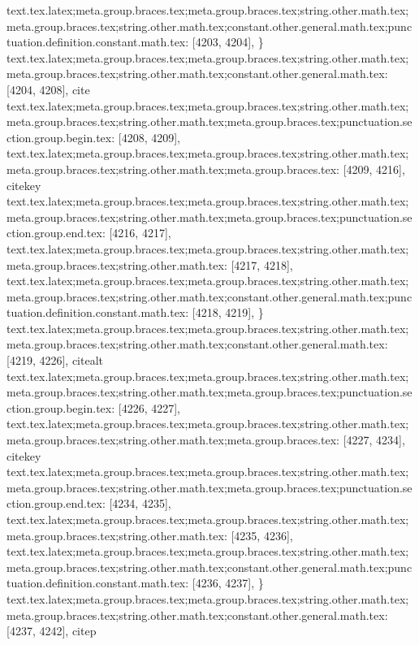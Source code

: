 {{{{{{{{{{{{{{{{{{{{{{{{{{{{{{{{{{{{{{{{{{{{{{{{{{{{{{{{{{{{{{{{{{{{{{{{{{{{{{{{{{{{{{{{{{{{{{{{{{{{{{{{{{{{{{{{{{{{{{{{{{{{{{{{{{{{{}
text.tex.latex;meta.group.braces.tex;meta.group.braces.tex;string.other.math.tex;meta.group.braces.tex;string.other.math.tex;constant.other.general.math.tex;punctuation.definition.constant.math.tex: [4203, 4204], {\}
text.tex.latex;meta.group.braces.tex;meta.group.braces.tex;string.other.math.tex;meta.group.braces.tex;string.other.math.tex;constant.other.general.math.tex: [4204, 4208], {cite}
text.tex.latex;meta.group.braces.tex;meta.group.braces.tex;string.other.math.tex;meta.group.braces.tex;string.other.math.tex;meta.group.braces.tex;punctuation.section.group.begin.tex: [4208, 4209], {{}
text.tex.latex;meta.group.braces.tex;meta.group.braces.tex;string.other.math.tex;meta.group.braces.tex;string.other.math.tex;meta.group.braces.tex: [4209, 4216], {citekey}
text.tex.latex;meta.group.braces.tex;meta.group.braces.tex;string.other.math.tex;meta.group.braces.tex;string.other.math.tex;meta.group.braces.tex;punctuation.section.group.end.tex: [4216, 4217], {}}
text.tex.latex;meta.group.braces.tex;meta.group.braces.tex;string.other.math.tex;meta.group.braces.tex;string.other.math.tex: [4217, 4218], {
}
text.tex.latex;meta.group.braces.tex;meta.group.braces.tex;string.other.math.tex;meta.group.braces.tex;string.other.math.tex;constant.other.general.math.tex;punctuation.definition.constant.math.tex: [4218, 4219], {\}
text.tex.latex;meta.group.braces.tex;meta.group.braces.tex;string.other.math.tex;meta.group.braces.tex;string.other.math.tex;constant.other.general.math.tex: [4219, 4226], {citealt}
text.tex.latex;meta.group.braces.tex;meta.group.braces.tex;string.other.math.tex;meta.group.braces.tex;string.other.math.tex;meta.group.braces.tex;punctuation.section.group.begin.tex: [4226, 4227], {{}
text.tex.latex;meta.group.braces.tex;meta.group.braces.tex;string.other.math.tex;meta.group.braces.tex;string.other.math.tex;meta.group.braces.tex: [4227, 4234], {citekey}
text.tex.latex;meta.group.braces.tex;meta.group.braces.tex;string.other.math.tex;meta.group.braces.tex;string.other.math.tex;meta.group.braces.tex;punctuation.section.group.end.tex: [4234, 4235], {}}
text.tex.latex;meta.group.braces.tex;meta.group.braces.tex;string.other.math.tex;meta.group.braces.tex;string.other.math.tex: [4235, 4236], {
}
text.tex.latex;meta.group.braces.tex;meta.group.braces.tex;string.other.math.tex;meta.group.braces.tex;string.other.math.tex;constant.other.general.math.tex;punctuation.definition.constant.math.tex: [4236, 4237], {\}
text.tex.latex;meta.group.braces.tex;meta.group.braces.tex;string.other.math.tex;meta.group.braces.tex;string.other.math.tex;constant.other.general.math.tex: [4237, 4242], {citep}
}}}}}}}}}}}}}}}}}}}}}}}}}}}}}}}}}}}}}}}}}}}}}}}}}}}}}}}}}}}}}}}}}}}}}}}}}}}}}}}}}}}}}}}}}}}}}}}}}}}}}}}}}}}}}}}}}}}}}}}}}}}}}}}}}}}}}}}
